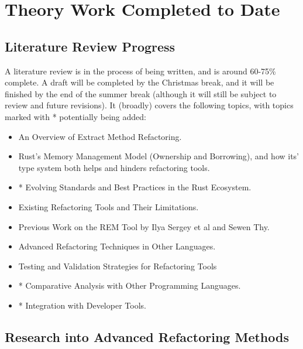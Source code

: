 \section{Theory Work Completed to Date}

\subsection*{Literature Review Progress}

A literature review is in the process of being written, and is around 60-75\%
complete. A draft will be completed by the Christmas break, and it will be
finished by the end of the summer break (although it will still be subject to
review and future revisions). It (broadly) covers the following topics, with
topics marked with * potentially being added:
\begin{itemize}[itemsep=0pt]
    \item An Overview of Extract Method Refactoring.
    \item Rust's Memory Management Model (Ownership and Borrowing), and how its'
    type system both helps and hinders refactoring tools.
    \item * Evolving Standards and Best Practices in the Rust Ecosystem.
    \item Existing Refactoring Tools and Their Limitations.
    \item Previous Work on the REM Tool by Ilya Sergey et al and Sewen Thy.
    \item Advanced Refactoring Techniques in Other Languages.
    \item Testing and Validation Strategies for Refactoring Tools
    \item * Comparative Analysis with Other Programming Languages.
    \item * Integration with Developer Tools.
\end{itemize}

\subsection*{Research into Advanced Refactoring Methods}

